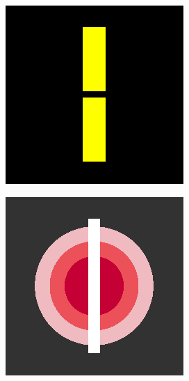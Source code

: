 \begin{figure}[H]
    \centering
    \begin{subfigure}{0.4\linewidth}
        \centering
        \includegraphics[width=0.8\linewidth]{image/image_inpaint_synthetic/case01-toinpaint.png}
    \end{subfigure}
    \begin{subfigure}{0.4\linewidth}
        \centering
        \includegraphics[width=0.8\linewidth]{image/image_inpaint_synthetic/case02-toinpaint.png}
    \end{subfigure}
    \begin{subfigure}{0.4\linewidth}

\end{subfigure}
\end{figure}
